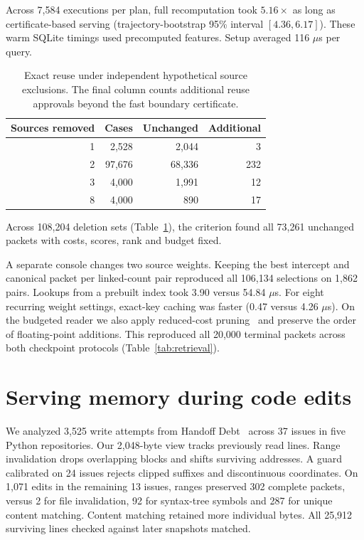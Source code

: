 \documentclass[conference]{IEEEtran}
\begin{document}
Across 7,584 executions per plan, full recomputation took $5.16\times$ as long as certificate-based serving (trajectory-bootstrap 95\% interval $[4.36,6.17]$). These warm SQLite timings used precomputed features. Setup averaged 116 $\mu$s per query. 

\balance
\begin{table}[t]
\caption{Exact reuse under independent hypothetical source exclusions. The final column counts additional reuse approvals beyond the fast boundary certificate.}
\centering\small
\begin{tabular}{rrrr}\toprule
Sources removed & Cases & Unchanged & Additional\\\midrule
1 & 2,528 & 2,044 & 3\\
2 & 97,676 & 68,336 & 232\\
3 & 4,000 & 1,991 & 12\\
8 & 4,000 & 890 & 17\\
\bottomrule\end{tabular}
\label{tab:exclusions}
\end{table}

Across 108,204 deletion sets (Table~\ref{tab:exclusions}), the criterion found all 73,261 unchanged packets with costs, scores, rank and budget fixed.

A separate console changes two source weights. Keeping the best intercept and canonical packet per linked-count pair reproduced all 106,134 selections on 1,862 pairs. Lookups from a prebuilt index took 3.90 versus 54.84 $\mu$s. For eight recurring weight settings, exact-key caching was faster (0.47 versus 4.26 $\mu$s). On the budgeted reader we also apply reduced-cost pruning~\cite{coreknap} and preserve the order of floating-point additions. This reproduced all 20,000 terminal packets across both checkpoint protocols (Table~\ref{tab:retrieval}).

\section{Serving memory during code edits}
We analyzed 3,525 write attempts from Handoff Debt~\cite{handoff} across 37 issues in five Python repositories. Our 2,048-byte view tracks previously read lines. Range invalidation drops overlapping blocks and shifts surviving addresses. A guard calibrated on 24 issues rejects clipped suffixes and discontinuous coordinates. On 1,071 edits in the remaining 13 issues, ranges preserved 302 complete packets, versus 2 for file invalidation, 92 for syntax-tree symbols and 287 for unique content matching. Content matching retained more individual bytes. All 25,912 surviving lines checked against later snapshots matched.
\end{document}
